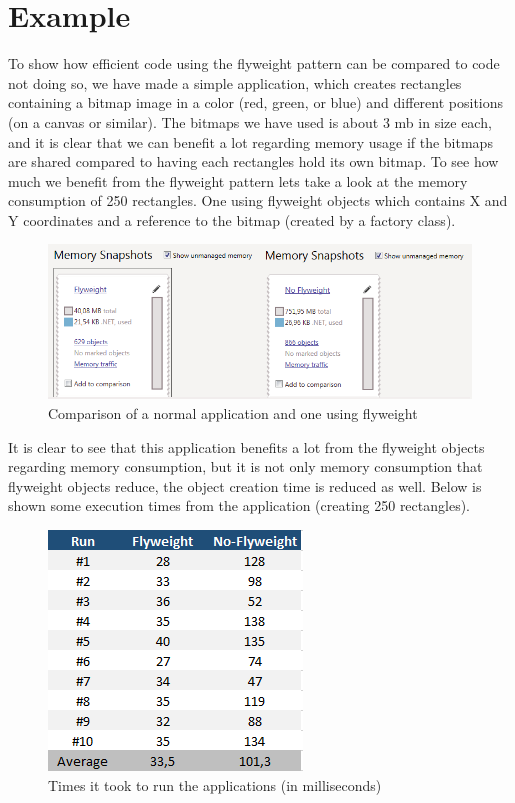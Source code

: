 \section{Example}
To show how efficient code using the flyweight pattern can be compared to code not doing so, we have made a simple application, which creates rectangles containing a bitmap image in a color (red, green, or blue) and different positions (on a canvas or similar).
The bitmaps we have used is about 3 mb in size each, and it is clear that we can benefit a lot regarding memory usage if the bitmaps are shared compared to having each rectangles hold its own bitmap.
To see how much we benefit from the flyweight pattern lets take a look at the memory consumption of 250 rectangles. One using flyweight objects which contains X and Y coordinates and a reference to the bitmap (created by a factory class).
\begin{figure}[h]
\centering
\includegraphics[width=0.7\linewidth]{Content/Flyweight_Stats}
\caption{Comparison of a normal application and one using flyweight}
\label{fig:Flyweight_Stats}
\end{figure}
It is clear to see that this application benefits a lot from the flyweight objects regarding memory consumption, but it is not only memory consumption that flyweight objects reduce, the object creation time is reduced as well. Below is shown some execution times from the application (creating 250 rectangles).
\begin{figure}[h]
\centering
\includegraphics{Content/TimeTable}
\caption{Times it took to run the applications (in milliseconds)}
\label{fig:TimeTable}
\end{figure}
